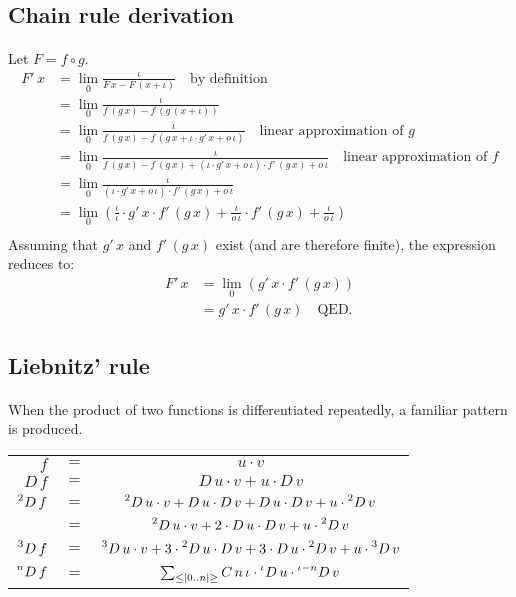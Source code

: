 \documentclass[11pt]{article}
\newcommand*\id{\iota}
\newcommand*\cd{\cdot}
\newcommand*\prg{\paragraph}
\newcommand*\pt{\prescript}
\begin{document}
\subsection{Chain rule derivation}
\prg{}Let $F=f\circ g$.
\[
\begin{aligned}
F'\,x&=\lim_0\frac{\id}{F\,x-F\,(x+\id)} \quad\textrm{by definition} \\
     &=\lim_0\frac{\id}{f\,(g\,x)-f\,(g\,(x+\id))} \\
     &=\lim_0\frac{\id}{f\,(g\,x)-f\,(g\,x+\id\cd g'\,x+o\,\id)} \quad\textrm{linear approximation of }g \\
     &=\lim_0\frac{\id}{f\,(g\,x)-f\,(g\,x)+(\id\cd g'\,x+o\,\id)\cd f'\,(g\,x)+o\,\id} \quad\textrm{linear approximation of }f \\
     &=\lim_0\frac{\id}{(\id\cd g'\,x+o\,\id)\cd f'\,(g\,x)+o\,\id} \\
     &=\lim_0\left(\frac \id\id\cd g'\,x\cd f'\,(g\,x)+\frac{\id}{o\,\id}\cd f'\,(g\,x)+\frac{\id}{o\,\id}\right) \\
\end{aligned}
\]
Assuming that $g'\,x$ and $f'\,(g\,x)$ exist (and are therefore finite), the expression reduces to:
\[
\begin{aligned}
F'\,x&=\lim_0\left(g'\,x\cd f'\,(g\,x)\right) \\
     &=g'\,x\cd f'\,(g\,x) \quad\textrm{QED.}
\end{aligned}
\]

\subsection{Liebnitz' rule}
\prg{}When the product of two functions is differentiated repeatedly, a familiar pattern is produced. \\
\begin{center}
\begin{tabular}{r c c}
$f$&$=$&$u\cd v$ \\
$D\,f$&$=$&$D\,u\cd v+u\cd D\,v$ \\
$\pt{2}{}D\,f$&$=$&$\pt{2}{}D\,u\cd v+D\,u\cd D\,v+D\,u\cd D\,v+u\cd \pt{2}{}D\,v$ \\
                   &$=$&$\pt{2}{}D\,u\cd v+2\cd D\,u\cd D\,v+u\cd \pt{2}{}D\,v$ \\
$\pt{3}{}D\,f$&$=$&$\pt{3}{}D\,u\cd v+3\cd \pt{2}{}D\,u\cd D\,v+3\cd D\,u\cd\pt{2}{}D\,v+u\cd \pt{3}{}D\,v$ \\
$\pt{n}{}D\,f$&$=$&$\sum_{\leq|0..n|\geq}C\,n\,\id\cd\pt{\id}{}D\,u\cd\pt{\id-n}{}D\,v$
\end{tabular}
\end{center}
\end{document}
